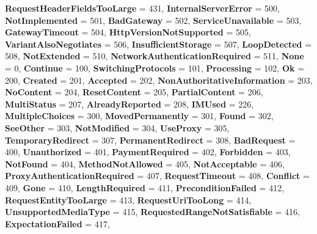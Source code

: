 \begin{DoxyCompactItemize}
\newline
{\bfseries Request\+Header\+Fields\+Too\+Large} = 431, 
{\bfseries Internal\+Server\+Error} = 500, 
{\bfseries Not\+Implemented} = 501, 
{\bfseries Bad\+Gateway} = 502, 
\newline
{\bfseries Service\+Unavailable} = 503, 
{\bfseries Gateway\+Timeout} = 504, 
{\bfseries Http\+Version\+Not\+Supported} = 505, 
{\bfseries Variant\+Also\+Negotiates} = 506, 
\newline
{\bfseries Insufficient\+Storage} = 507, 
{\bfseries Loop\+Detected} = 508, 
{\bfseries Not\+Extended} = 510, 
{\bfseries Network\+Authentication\+Required} = 511, 
\newline
{\bfseries None} = 0, 
{\bfseries Continue} = 100, 
{\bfseries Switching\+Protocols} = 101, 
{\bfseries Processing} = 102, 
\newline
{\bfseries Ok} = 200, 
{\bfseries Created} = 201, 
{\bfseries Accepted} = 202, 
{\bfseries Non\+Authoritative\+Information} = 203, 
\newline
{\bfseries No\+Content} = 204, 
{\bfseries Reset\+Content} = 205, 
{\bfseries Partial\+Content} = 206, 
{\bfseries Multi\+Status} = 207, 
\newline
{\bfseries Already\+Reported} = 208, 
{\bfseries I\+M\+Used} = 226, 
{\bfseries Multiple\+Choices} = 300, 
{\bfseries Moved\+Permanently} = 301, 
\newline
{\bfseries Found} = 302, 
{\bfseries See\+Other} = 303, 
{\bfseries Not\+Modified} = 304, 
{\bfseries Use\+Proxy} = 305, 
\newline
{\bfseries Temporary\+Redirect} = 307, 
{\bfseries Permanent\+Redirect} = 308, 
{\bfseries Bad\+Request} = 400, 
{\bfseries Unauthorized} = 401, 
\newline
{\bfseries Payment\+Required} = 402, 
{\bfseries Forbidden} = 403, 
{\bfseries Not\+Found} = 404, 
{\bfseries Method\+Not\+Allowed} = 405, 
\newline
{\bfseries Not\+Acceptable} = 406, 
{\bfseries Proxy\+Authentication\+Required} = 407, 
{\bfseries Request\+Timeout} = 408, 
{\bfseries Conflict} = 409, 
\newline
{\bfseries Gone} = 410, 
{\bfseries Length\+Required} = 411, 
{\bfseries Precondition\+Failed} = 412, 
{\bfseries Request\+Entity\+Too\+Large} = 413, 
\newline
{\bfseries Request\+Uri\+Too\+Long} = 414, 
{\bfseries Unsupported\+Media\+Type} = 415, 
{\bfseries Requested\+Range\+Not\+Satisfiable} = 416, 
{\bfseries Expectation\+Failed} = 417, 
\newline

\end{DoxyCompactItemize}
